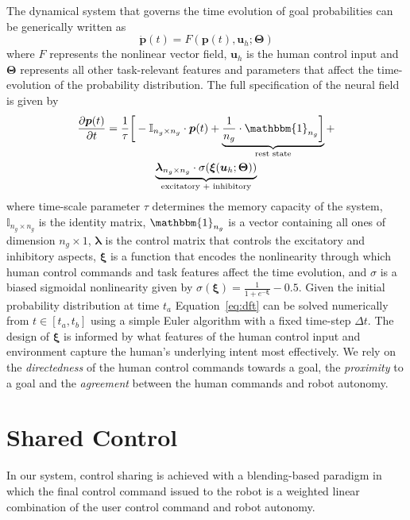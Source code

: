 \documentclass[conference]{IEEEtran}
\begin{document}
 The dynamical system that governs the time evolution of goal probabilities can be generically written as 
\begin{equation*}
\dot{\boldsymbol{p}}(t) = F(\boldsymbol{p}(t), \boldsymbol{u}_h ; \boldsymbol{\Theta})
\end{equation*}
where $F$ represents the nonlinear vector field, $\boldsymbol{u}_h$ is the human control input and $\boldsymbol{\Theta}$ represents all other task-relevant features and parameters that affect the time-evolution of the probability distribution. 
The full specification of the neural field is given by
\begin{multline}\label{eq:dft}
\frac{\partial \boldsymbol{p}(t)}{\partial t} = \frac{1}{\tau}\bigg[-\mathbb{I}_{n_g\times n_g}\cdot\boldsymbol{p}(t) + \underbrace{\frac{1}{n_g}\cdot\mathbbm{1}_{n_g}\bigg]}_{\text{rest state}} + \\ \underbrace{\boldsymbol{\lambda}_{n_g\times n_g}\cdot\sigma(\boldsymbol{\xi}(\boldsymbol{u}_h;\boldsymbol{\Theta}))}_{\text{excitatory + inhibitory}}
\end{multline}
where time-scale parameter $\tau$ determines the memory capacity of the system, $\mathbb{I}_{n_g\times n_g}$ is the identity matrix, $\mathbbm{1}_{n_g}$ is a vector containing all ones of dimension $n_g \times 1$, $\boldsymbol{\lambda}$ is the control matrix that controls the excitatory and inhibitory aspects, $\boldsymbol{\xi}$ is a function that encodes the nonlinearity through which human control commands and task features affect the time evolution, and $\sigma$ is a biased sigmoidal nonlinearity given by $\sigma(\boldsymbol{\xi}) = \frac{1}{1 + e^{-\boldsymbol{\xi}}} - 0.5$. 
Given the initial probability distribution at time $t_a$ Equation~\ref{eq:dft} can be solved numerically from $t \in [t_a, t_b]$ using a simple Euler algorithm with a fixed time-step $\Delta t$. The design of $\boldsymbol{\xi}$ is informed by what features of the human control input and environment capture the human's underlying intent most effectively. We rely on the \textit{directedness} of the human control commands towards a goal, the \textit{proximity} to a goal and the \textit{agreement} between the human commands and robot autonomy.

\section{Shared Control}\label{sec:shared-control}
In our system, control sharing is achieved with a blending-based paradigm in which the final control command issued to the robot is a weighted linear combination of the user control command and robot autonomy. 
\end{document}
